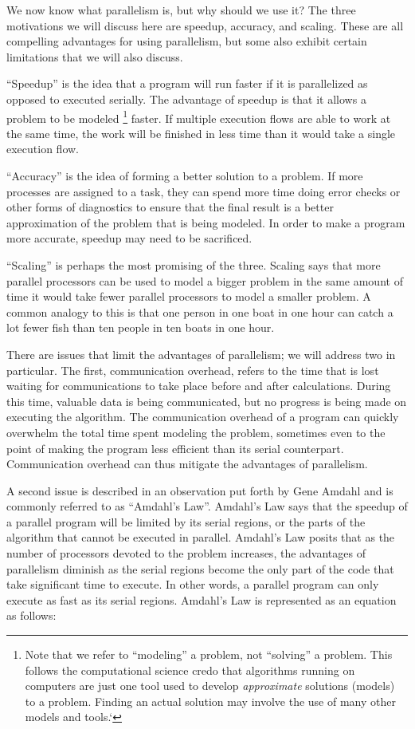 \documentclass[letterpaper,10pt,openany,oneside]{sphinxmanual}
\begin{document}
We now know what parallelism is, but why should we use it? The three
motivations we will discuss here are speedup, accuracy, and scaling.
These are all compelling advantages for using parallelism, but some also
exhibit certain limitations that we will also discuss.

“Speedup” is the idea that a program will run faster if it is
parallelized as opposed to executed serially. The advantage of speedup
is that it allows a problem to be modeled \footnote{
Note that we refer to ``modeling'' a problem, not ``solving'' a problem. This follows the computational science credo that algorithms running on computers are just one tool used to develop \emph{approximate} solutions (models) to a problem. Finding an actual solution may involve the use of many other models and tools.{}`
} faster. If multiple
execution flows are able to work at the same time, the work will be
finished in less time than it would take a single execution flow.

“Accuracy” is the idea of forming a better solution to a problem. If
more processes are assigned to a task, they can spend more time doing
error checks or other forms of diagnostics to ensure that the final
result is a better approximation of the problem that is being modeled.
In order to make a program more accurate, speedup may need to be
sacrificed.

“Scaling” is perhaps the most promising of the three. Scaling says that
more parallel processors can be used to model a bigger problem in the
same amount of time it would take fewer parallel processors to model a
smaller problem. A common analogy to this is that one person in one boat
in one hour can catch a lot fewer fish than ten people in ten boats in
one hour.

There are issues that limit the advantages of parallelism; we will
address two in particular. The first, communication overhead, refers to
the time that is lost waiting for communications to take place before
and after calculations. During this time, valuable data is being
communicated, but no progress is being made on executing the algorithm.
The communication overhead of a program can quickly overwhelm the total
time spent modeling the problem, sometimes even to the point of making
the program less efficient than its serial counterpart. Communication
overhead can thus mitigate the advantages of parallelism.

A second issue is described in an observation put forth by Gene Amdahl
and is commonly referred to as “Amdahl’s Law”. Amdahl’s Law says that
the speedup of a parallel program will be limited by its serial regions,
or the parts of the algorithm that cannot be executed in parallel.
Amdahl’s Law posits that as the number of processors devoted to the
problem increases, the advantages of parallelism diminish as the serial
regions become the only part of the code that take significant time to
execute. In other words, a parallel program can only execute as fast as
its serial regions. Amdahl’s Law is represented as an equation as follows:
\end{document}
